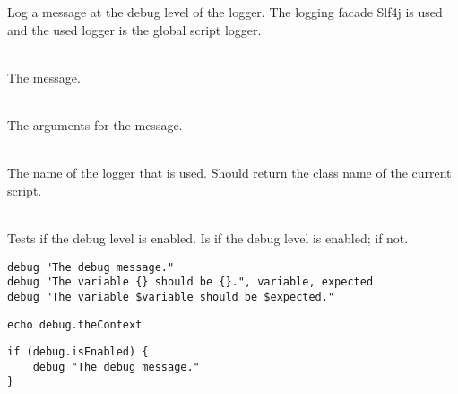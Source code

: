 %


Log a message at the debug level of the logger.
The logging facade Slf4j\cite{slf4j13} is used and the used logger is
the global script logger.

\begin{asparadesc}
%
\item[\code{message}] \hfill \\
The message.
%
\item[\code{args}] \hfill \\
The arguments for the message.
%
\item[\code{theContext}] \hfill \\
The name of the logger that is used. Should return the class name of the current
script.
%
\item[\code{isEnabled}] \hfill \\
Tests if the debug level is enabled. Is  if the debug level is enabled;
 if not.
%
\end{asparadesc}

\begin{lstlisting}[style=Groovybash, label={lst:example_debug1}, title={Outputs a debug logging message with arguments.}]
debug "The debug message."
debug "The variable {} should be {}.", variable, expected
debug "The variable $variable should be $expected."
\end{lstlisting}

\begin{lstlisting}[style=Groovybash, label={lst:example_debug2}, title={Prints the name of the current logger.}]
echo debug.theContext
\end{lstlisting}

\begin{lstlisting}[style=Groovybash, label={lst:example_debug3}, title={Tests if the debug level is enabled.}]
if (debug.isEnabled) {
    debug "The debug message."
}
\end{lstlisting}

